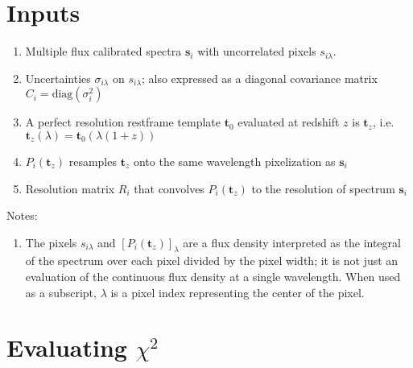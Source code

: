 \documentclass[12pt]{article}
\begin{document}
\maketitle


\section{Inputs}

\begin{enumerate}
    \item Multiple flux calibrated spectra $\mathbf{s}_i$ with uncorrelated
        pixels $s_{i\lambda}$.
    \item Uncertainties $\sigma_{i\lambda}$ on $s_{i\lambda}$; also expressed
        as a diagonal covariance matrix $C_i = \mathrm{diag}(\sigma_i^2)$
    \item A perfect resolution restframe template $\mathbf{t}_0$ evaluated at
        redshift $z$ is $\mathbf{t}_z$, i.e. $\mathbf{t}_z(\lambda) =
        \mathbf{t}_0(\lambda(1+z))$
    \item $P_i(\mathbf{t}_z)$ resamples $\mathbf{t}_z$ onto the same
        wavelength pixelization as $\mathbf{s}_i$
    \item Resolution matrix $R_i$ that convolves $P_i(\mathbf{t}_z)$ to the
        resolution of spectrum $\mathbf{s}_i$
\end{enumerate}

Notes:
\begin{enumerate}
    \item The pixels $s_{i\lambda}$ and $[P_i(\mathbf{t}_z)]_\lambda$
        are a flux density interpreted as the
        integral of the spectrum over each pixel divided by
        the pixel width; it is not just an evaluation of the continuous
        flux density at a single wavelength.  When used as a subscript,
        $\lambda$ is a pixel index representing the center
        of the pixel.
\end{enumerate}

\section{Evaluating $\chi^2$}
\end{document}
